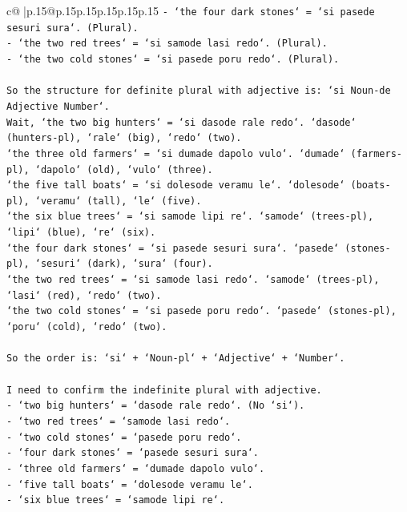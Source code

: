 \documentclass{article}
\begin{document}
{\begin{supertabular}{c@{$\;$}|p{.15\linewidth}@{}p{.15\linewidth}p{.15\linewidth}p{.15\linewidth}p{.15\linewidth}p{.15\linewidth}}
{{{\texttt{{-} `the four dark stones` = `si pasede sesuri sura`. (Plural).} \\
\texttt{{-} `the two red trees` = `si samode lasi redo`. (Plural).} \\
\texttt{{-} `the two cold stones` = `si pasede poru redo`. (Plural).} \\
\\ 
\texttt{So the structure for definite plural with adjective is: `si Noun{-}de Adjective Number`.} \\
\texttt{Wait, `the two big hunters` = `si dasode rale redo`. `dasode` (hunters{-}pl), `rale` (big), `redo` (two).} \\
\texttt{`the three old farmers` = `si dumade dapolo vulo`. `dumade` (farmers{-}pl), `dapolo` (old), `vulo` (three).} \\
\texttt{`the five tall boats` = `si dolesode veramu le`. `dolesode` (boats{-}pl), `veramu` (tall), `le` (five).} \\
\texttt{`the six blue trees` = `si samode lipi re`. `samode` (trees{-}pl), `lipi` (blue), `re` (six).} \\
\texttt{`the four dark stones` = `si pasede sesuri sura`. `pasede` (stones{-}pl), `sesuri` (dark), `sura` (four).} \\
\texttt{`the two red trees` = `si samode lasi redo`. `samode` (trees{-}pl), `lasi` (red), `redo` (two).} \\
\texttt{`the two cold stones` = `si pasede poru redo`. `pasede` (stones{-}pl), `poru` (cold), `redo` (two).} \\
\\ 
\texttt{So the order is: `si` + `Noun{-}pl` + `Adjective` + `Number`.} \\
\\ 
\texttt{I need to confirm the indefinite plural with adjective.} \\
\texttt{{-} `two big hunters` = `dasode rale redo`. (No `si`).} \\
\texttt{{-} `two red trees` = `samode lasi redo`.} \\
\texttt{{-} `two cold stones` = `pasede poru redo`.} \\
\texttt{{-} `four dark stones` = `pasede sesuri sura`.} \\
\texttt{{-} `three old farmers` = `dumade dapolo vulo`.} \\
\texttt{{-} `five tall boats` = `dolesode veramu le`.} \\
\texttt{{-} `six blue trees` = `samode lipi re`.} \\
}}}
\end{supertabular}}
\end{document}
